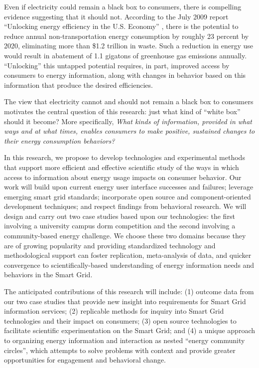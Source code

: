 Even if electricity could remain a black box to consumers, there is
compelling evidence suggesting that it should not.  According to the July
2009 report ``Unlocking energy efficiency in the U.S. Economy''
\cite{Granade09}, there is the potential to reduce annual
non-transportation energy consumption by roughly 23 percent by 2020,
eliminating more than \$1.2 trillion in waste.  Such a reduction in energy
use would result in abatement of 1.1 gigatons of greenhouse gas emissions
annually. ``Unlocking'' this untapped potential requires, in part, improved
access by consumers to energy information, along with changes in behavior
based on this information that produce the desired efficiencies.

The view that electricity cannot and should not remain a black box to
consumers motivates the central question of this research: just what kind of
``white box'' should it become?  More specifically, {\em What kinds of
  information, provided in what ways and at what times, enables consumers
  to make positive, sustained changes to their energy consumption
  behaviors?}

In this research, we propose to develop technologies and experimental
methods that support more efficient and effective scientific study of the ways
in which access to information about energy usage impacts on consumer
behavior.  Our work will build upon current energy user interface successes
and failures; leverage emerging smart grid standards; incorporate open
source and component-oriented development techniques; and respect findings
from behavioral research. We will design and carry out two case studies
based upon our technologies: the first involving a university campus dorm
competition and the second involving a community-based energy challenge. We
choose these two domains because they are of growing popularity and
providing standardized technology and methodological support can foster
replication, meta-analysis of data, and quicker convergence to
scientifically-based understanding of energy information needs and
behaviors in the Smart Grid.  

The anticipated contributions of this research will include: (1) outcome
data from our two case studies that provide new insight into requirements
for Smart Grid information services; (2) replicable methods for inquiry
into Smart Grid technologies and their impact on consumers; (3) open
source technologies to facilitate scientific experimentation on the Smart
Grid; and (4) a unique approach to organizing energy information and
interaction as nested ``energy community circles'', which attempts to solve
problems with context and provide greater opportunities for engagement and
behavioral change.


